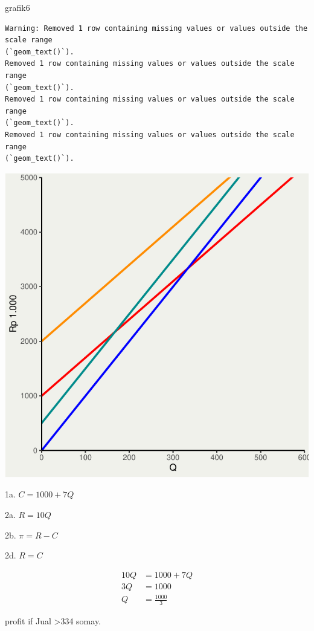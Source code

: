 \documentclass[
  letterpaper,
  DIV=11,
  numbers=noendperiod]{scrartcl}
\newenvironment{Shaded}{\begin{snugshade}}{\end{snugshade}}
\newcommand{\NormalTok}[1]{\textcolor[rgb]{0.00,0.23,0.31}{#1}}
\begin{document}
\begin{Shaded}
\begin{Highlighting}[]
\NormalTok{grafik6}
\end{Highlighting}
\end{Shaded}

\begin{verbatim}
Warning: Removed 1 row containing missing values or values outside the scale range
(`geom_text()`).
Removed 1 row containing missing values or values outside the scale range
(`geom_text()`).
Removed 1 row containing missing values or values outside the scale range
(`geom_text()`).
Removed 1 row containing missing values or values outside the scale range
(`geom_text()`).
\end{verbatim}

\includegraphics{index_files/figure-pdf/unnamed-chunk-8-1.pdf}

1a. \(C=1000+7Q\)

2a. \(R=10Q\)

2b. \(\pi=R-C\)

2d. \(R=C\)

\[
\begin{align}
10Q&=1000+7Q \\
3Q&=1000 \\
Q&=\frac{1000}{3}
\end{align}
\]

profit if Jual \textgreater334 somay.
\end{document}
